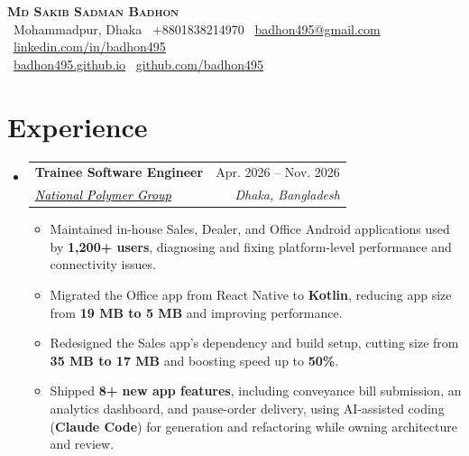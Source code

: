 \documentclass[a4paper]{article}
\makeatletter
\newcommand{\resumeItem}[1]{
  \item\small{
    {#1 \vspace{-2pt}}
  }
}
\newcommand{\resumeSubheading}[4]{
  \vspace{-2pt}\item
    \begin{tabular*}{0.97\textwidth}[t]{l@{\extracolsep{\fill}}r}
      \textbf{#1} & #2 \\
      \textit{\small#3} & \textit{\small #4} \\
    \end{tabular*}\vspace{-7pt}
}
\newcommand{\resumeSubHeadingListStart}{\begin{itemize}[leftmargin=0.15in, label={}]}
\newcommand{\resumeSubHeadingListEnd}{\end{itemize}}
\newcommand{\resumeItemListStart}{\begin{itemize}}
\newcommand{\resumeItemListEnd}{\end{itemize}\vspace{-5pt}}
\makeatother
\begin{document}
\begin{center}
    \textbf{\Huge \scshape Md Sakib Sadman Badhon} \\ \vspace{4pt}
    \faMapMarker*~Mohammadpur, Dhaka \enspace
    ~+8801838214970 \enspace
    \faEnvelope~\href{mailto:badhon495@gmail.com}{badhon495@gmail.com} \enspace
    \faLinkedin~\href{https://linkedin.com/in/badhon495/}{linkedin.com/in/badhon495} \\ \vspace{4pt}
    \faGlobe~\href{https://badhon495.github.io/}{badhon495.github.io} \enspace
    \faGithub~\href{https://github.com/badhon495}{github.com/badhon495} \enspace
\end{center}


\section{Experience}
  \resumeSubHeadingListStart

    \resumeSubheading
      {Trainee Software Engineer}{Apr. 2026 -- Nov. 2026}
      {\href{https://www.nationalpolymer.net/}{\textcolor{black}{National Polymer Group}}}{Dhaka, Bangladesh}
      \resumeItemListStart
      \resumeItem{Maintained in-house Sales, Dealer, and Office Android applications used by \textbf{1,200+ users}, diagnosing and fixing platform-level performance and connectivity issues.}
        \resumeItem{Migrated the Office app from React Native to \textbf{Kotlin}, reducing app size from \textbf{19 MB to 5 MB} and improving performance.}
        \resumeItem{Redesigned the Sales app's dependency and build setup, cutting size from \textbf{35 MB to 17 MB} and boosting speed up to \textbf{50\%}.}
        \resumeItem{Shipped \textbf{8+ new app features}, including conveyance bill submission, an analytics dashboard, and pause-order delivery, using AI-assisted coding (\textbf{Claude Code}) for generation and refactoring while owning architecture and review.}
      \resumeItemListEnd

  \resumeSubHeadingListEnd




\end{document}
